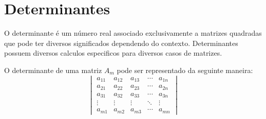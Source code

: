 \documentclass[12pt]{article}
\begin{document}
\section{Determinantes}
O determinante é um número real associado exclusivamente a matrizes quadradas
que pode ter diversos significados dependendo do contexto. Determinantes 
possuem diversos calculos especificos para diversos casos de matrizes.

O determinante de uma matriz $A_m$ pode ser representado da seguinte maneira:
\[
\begin{vmatrix}
    a_{11} & a_{12} & a_{13} & \cdots & a_{1n} \\
    a_{21} & a_{22} & a_{23} & \cdots & a_{2n} \\
    a_{31} & a_{32} & a_{33} & \cdots & a_{3n} \\
    \vdots & \vdots & \vdots & \ddots & \vdots \\
    a_{m1} & a_{m2} & a_{m3} & \cdots & a_{mn}
\end{vmatrix}
\]
\end{document}
